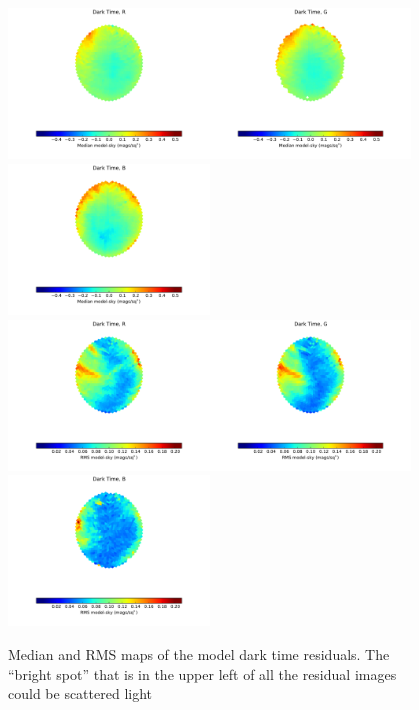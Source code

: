 \documentclass[]{spie}
\begin{document}
\begin{figure}[ht]
\begin{center}
  \includegraphics[height=4cm]{plots/medianResidMap_R.pdf}\includegraphics[height=4cm]{plots/medianResidMap_G.pdf}\includegraphics[height=4cm]{plots/medianResidMap_B.pdf} \\
  \includegraphics[height=4cm]{plots/stdResidMap_R.pdf}\includegraphics[height=4cm]{plots/stdResidMap_g.pdf}\includegraphics[height=4cm]{plots/stdResidMap_b.pdf}
  \end{center}
  \caption{Median and RMS maps of the model dark time residuals. The ``bright spot'' that is in the upper left of all the residual images could be scattered light }
\end{figure}
\end{document}
